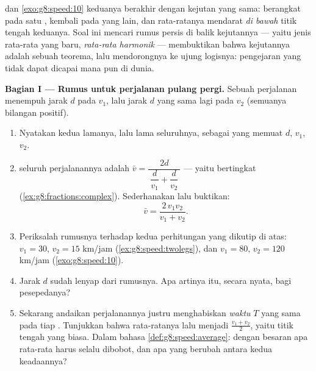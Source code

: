 \begin{problem}
\label{pb:g8:speed:1}
 dan \cref{exo:g8:speed:10} keduanya
berakhir dengan kejutan yang sama: berangkat pada satu ,
kembali pada  yang lain, dan  rata-ratanya mendarat
\emph{di bawah} titik tengah keduanya. Soal ini mencari rumus persis
di balik kejutannya --- yaitu jenis rata-rata yang baru,
\emph{rata-rata harmonik} --- membuktikan
bahwa kejutannya adalah sebuah teorema, lalu mendorongnya ke
ujung logisnya: pengejaran yang tidak dapat dicapai  mana pun
di dunia.

\medskip
\noindent\textbf{Bagian I --- Rumus untuk perjalanan pulang pergi.}
Sebuah perjalanan menempuh jarak $d$ pada  $v_1$, lalu jarak
$d$ yang sama lagi pada  $v_2$ (semuanya bilangan positif).
\begin{enumerate}
  \item Nyatakan kedua lamanya, lalu lama seluruhnya, sebagai
         yang memuat $d$, $v_1$, $v_2$.
  \item {} seluruh perjalanannya adalah
        $\bar v = \dfrac{2d}{\ \dfrac{d}{v_1} + \dfrac{d}{v_2}\ }$
        --- yaitu  bertingkat
        (\cref{ex:g8:fractions:complex}). Sederhanakan lalu buktikan:
        \[
        \bar v = \frac{2\, v_1 v_2}{v_1 + v_2} .
        \]
  \item Periksalah rumusnya terhadap kedua perhitungan yang dikutip
        di atas: $v_1 = 30$, $v_2 = 15$ km/jam
        (\cref{ex:g8:speed:twolegs}), dan $v_1 = 80$,
        $v_2 = 120$ km/jam (\cref{exo:g8:speed:10}).
  \item Jarak $d$ sudah lenyap dari rumusnya. Apa artinya itu,
        secara nyata, bagi pesepedanya?
  \item Sekarang andaikan perjalanannya justru menghabiskan
        \emph{waktu} $T$ yang sama pada tiap . Tunjukkan
        bahwa  rata-ratanya lalu menjadi
        $\frac{v_1 + v_2}{2}$, yaitu titik tengah yang biasa.
        Dalam bahasa \cref{def:g8:speed:average}: dengan besaran
        apa rata-rata  harus selalu dibobot, dan apa yang
        berubah antara kedua keadaannya?
\end{enumerate}


\end{problem}
